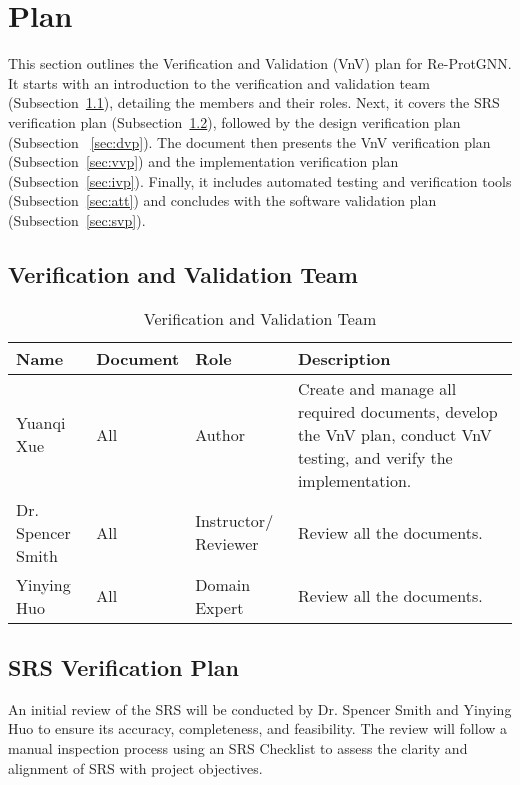 \documentclass[12pt, titlepage]{article}
\begin{document}
\section{Plan}

This section outlines the Verification and Validation (VnV) plan for Re-ProtGNN. It starts with an introduction to the verification and validation team (Subsection~\ref{sec:vvt}), detailing the members and their roles. Next, it covers the SRS verification plan (Subsection~\ref{sec:srsvp}), followed by the design verification plan (Subsection ~\ref{sec:dvp}). The document then presents the VnV verification plan (Subsection~\ref{sec:vvp}) and the implementation verification plan (Subsection~\ref{sec:ivp}). Finally, it includes automated testing and verification tools (Subsection~\ref{sec:att}) and concludes with the software validation plan (Subsection~\ref{sec:svp}).

\subsection{Verification and Validation Team}
\label{sec:vvt}

\begin{table}[h]
    \centering
    \begin{tabular}{|l|l|l|p{5cm}|}
        \hline
        \textbf{Name} & \textbf{Document} & \textbf{Role} & \textbf{Description} \\ 
        \hline
        Yuanqi Xue & All & Author & Create and manage all required documents, develop the VnV plan, conduct VnV testing, and verify the implementation. \\ 
        \hline
        Dr. Spencer Smith & All & Instructor/ Reviewer & Review all the documents. \\ 
        \hline
        Yinying Huo & All & Domain Expert & Review all the documents. \\ 
        \hline
    \end{tabular}
    \caption{Verification and Validation Team}
\end{table}

\subsection{SRS Verification Plan}
\label{sec:srsvp}
An initial review of the SRS will be conducted by Dr. Spencer Smith and Yinying Huo to ensure its accuracy, completeness, and feasibility. The review will follow a manual inspection process using an SRS Checklist to assess the clarity and alignment of SRS with project objectives.
\end{document}
